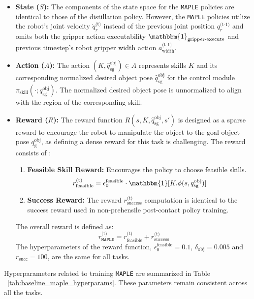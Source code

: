 \begin{itemize}
    \medskip
    \item \textbf{State (\( S \)):} The components of the state space for the \texttt{MAPLE} policies are identical to those of the distillation policy. However, the \texttt{MAPLE} policies utilize the robot’s joint velocity $\dot{q}^\text{(t)}_r$ instead of the previous joint position $q^\text{(t-1)}_r$ and omits both the gripper action executability $\mathbbm{1}_\text{gripper-execute}$ and previous timestep's robot gripper width action $a^\text{(t-1)}_\text{width}$.

    \medskip
    \item \textbf{Action (\( A \)):} The action \( (K, \hat{q}^{\text{obj}}_{\text{sg}}) \in A \) represents skills $K$ and its corresponding normalized desired object pose $\hat{q}^{\text{obj}}_{\text{sg}}$ for the control module \( \pi_{\text{skill}}(\cdot;q^{\text{obj}}_{\text{sg}})\). The normalized desired object pose is unnormalized to align with the region of the corresponding skill.
    
    \medskip
    
    \item \textbf{Reward (\( R \)):} The reward function \( R(s, K, \hat{q}^{\text{obj}}_{\text{sg}}, s') \) is designed as a sparse reward to encourage the robot to manipulate the object to the goal object pose \( q^{\text{obj}}_\text{g} \), as defining a dense reward for this task is challenging. The reward consists of :

    \begin{enumerate}

        \item \textbf{Feasible Skill Reward:} Encourages the policy to choose feasible skills.
        \[
        \begin{aligned}
        r^\text{(t)}_{\text{feasible}} = {\epsilon_0^{\text{feasible}}} \cdot \mathbbm{1}[K.\phi (s, q^{\text{obj}}_{\text{sg}}) ]
        \end{aligned}
        \]
        
        \item \textbf{Success Reward:} The reward $r^\text{(t)}_\text{success}$ computation is identical to the success reward used in non-prehensile post-contact policy training. %
    \end{enumerate}

    The overall reward is defined as:
    \[
    r^\text{(t)}_{\texttt{MAPLE}} =  r^\text{(t)}_{\text{feasible}} + r^\text{(t)}_{\text{success}}
    \]
    The hyperparameters of the reward function, $\epsilon_0^{\text{feasible}} = 0.1$, $\delta_\text{obj} = 0.005$ and $r_{\text{succ}} = 100$, are the same for all tasks.
\end{itemize}


Hyperparameters related to training \texttt{MAPLE} are summarized in Table ~\ref{tab:baseline_maple_hyperparams}. These parameters remain consistent across all the tasks. 
